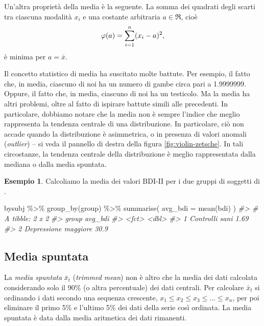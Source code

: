 \documentclass[
  10pt,
  italian,
  a4paper,
  extrafontsizes,onecolumn,openright
  ]{memoir}
\newenvironment{Shaded}{\begin{snugshade}}{\end{snugshade}}
\newcommand{\AttributeTok}[1]{\textcolor[rgb]{0.77,0.63,0.00}{#1}}
\newcommand{\CommentTok}[1]{\textcolor[rgb]{0.56,0.35,0.01}{\textit{#1}}}
\newcommand{\FunctionTok}[1]{\textcolor[rgb]{0.00,0.00,0.00}{#1}}
\newcommand{\NormalTok}[1]{#1}
\newcommand{\SpecialCharTok}[1]{\textcolor[rgb]{0.00,0.00,0.00}{#1}}
\theoremstyle{definition}
\theoremstyle{definition}
\newtheorem{example}{Esempio}[chapter]
\theoremstyle{definition}
\theoremstyle{definition}
\theoremstyle{remark}
\begin{document}
Un'altra proprietà della media è la seguente. La somma dei quadrati
degli scarti tra ciascuna modalità \(x_i\) e una costante arbitraria
\(a \in \Re\), cioè \[\varphi(a) = \sum_{i=1}^n (x_i - a)^2,\notag\] è
minima per \(a = \bar{x}\).

Il concetto statistico di media ha suscitato molte battute. Per esempio,
il fatto che, in media, ciascuno di noi ha un numero di gambe circa pari
a 1.9999999. Oppure, il fatto che, in media, ciascuno di noi ha un
testicolo. Ma la media ha altri problemi, oltre al fatto di ispirare
battute simili alle precedenti. In particolare, dobbiamo notare che la
media non è sempre l'indice che meglio rappresenta la tendenza centrale
di una distribuzione. In particolare, ciò non accade quando la
distribuzione è asimmetrica, o in presenza di valori anomali (\emph{outlier})
-- si veda il pannello di destra della figura \ref{fig:violin-zetsche}. In tali circostanze, la tendenza centrale della distribuzione è meglio rappresentata dalla mediana o dalla media spuntata.

\begin{example}

Calcoliamo la media dei valori BDI-II per i due gruppi di soggetti di \textcite{zetschefuture2019}.

\begin{Shaded}
\begin{Highlighting}[]
\NormalTok{bysubj }\SpecialCharTok{\%\textgreater{}\%} 
  \FunctionTok{group\_by}\NormalTok{(group) }\SpecialCharTok{\%\textgreater{}\%} 
  \FunctionTok{summarise}\NormalTok{(}
    \AttributeTok{avg\_bdi =} \FunctionTok{mean}\NormalTok{(bdi)}
\NormalTok{  ) }
\CommentTok{\#\textgreater{} \# A tibble: 2 x 2}
\CommentTok{\#\textgreater{}   group                avg\_bdi}
\CommentTok{\#\textgreater{}   \textless{}fct\textgreater{}                  \textless{}dbl\textgreater{}}
\CommentTok{\#\textgreater{} 1 Controlli sani          1.69}
\CommentTok{\#\textgreater{} 2 Depressione maggiore   30.9}
\end{Highlighting}
\end{Shaded}

\end{example}

\hypertarget{media-spuntata}{%
\subsection{Media spuntata}\label{media-spuntata}}

La \emph{media spuntata} \(\bar{x}_t\) (\emph{trimmed mean}) non è altro che la
media dei dati calcolata considerando solo il 90\% (o altra percentuale)
dei dati centrali. Per calcolare \(\bar{x}_t\) si ordinando i dati secondo
una sequenza crescente, \(x_1 \leq x_2 \leq x_3 \leq \dots \leq x_n\), per
poi eliminare il primo 5\% e l'ultimo 5\% dei dati della serie così
ordinata. La media spuntata è data dalla media aritmetica dei dati rimanenti.
\end{document}
